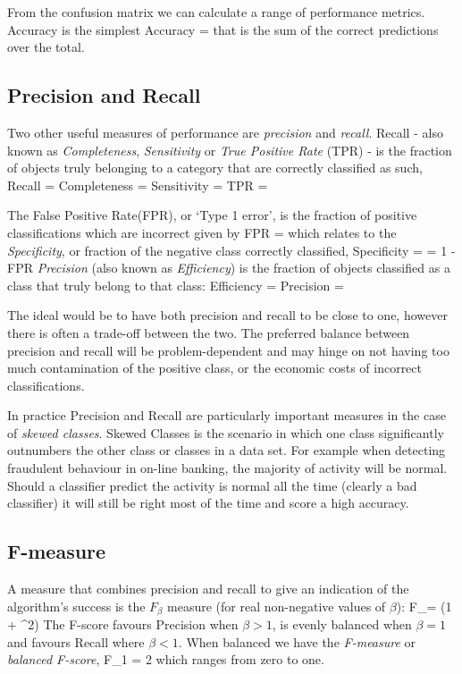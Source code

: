 From the confusion matrix we can calculate a range of performance metrics.
Accuracy is the simplest
\be
Accuracy = 
\ee
that is the sum of the correct predictions over the total.

\subsection{Precision and Recall}

Two other useful measures of performance are \textit{precision} and \textit{recall}\citep{flach2012machine}\citep{ball2010data}.
Recall - also known as \textit{Completeness}, \textit{Sensitivity} or \textit{True Positive Rate} (TPR) - is the fraction of objects truly belonging to a category that are correctly classified as such,
\be
Recall = Completeness = Sensitivity = TPR =  
\ee

The False Positive Rate(FPR), or `Type 1 error', is the fraction of positive classifications which are incorrect given by
\be
FPR = 
\ee
which relates to the \textit{Specificity}, or fraction of the negative class correctly classified,
\be
Specificity =  = 1 - FPR
\ee
\textit{Precision} (also known as \textit{Efficiency}) is the fraction of objects classified as a class that truly belong to that class:
\be
Efficiency = Precision =  
\ee

The ideal would be to have both precision and recall to be close to one, however there is often a trade-off between the two.
The preferred balance between precision and recall will be problem-dependent and may hinge on not having too much contamination of the positive class, or the economic costs of incorrect classifications.

In practice Precision and Recall are particularly important measures in the case of \textit{skewed classes}.
Skewed Classes is the scenario in which one class significantly outnumbers the other class or classes in a data set.
For example when detecting fraudulent behaviour in on-line banking, the majority of activity will be normal.
Should a classifier predict the activity is normal all the time (clearly a bad classifier) it will still be right most of the time and score a high accuracy.

\subsection{F-measure}
A measure that combines precision and recall to give an indication of the algorithm's success is the $F_\beta$ measure (for real non-negative values of $\beta$)\citep{sokolova2006beyond}\citep{davis2006relationship}:
\be
F_\beta = \left(1 + \beta^2\right)
\ee
The F-score favours Precision when $\beta > 1$, is evenly balanced when $\beta = 1$ and favours Recall where $\beta < 1$.
When balanced we have the \textit{F-measure} or\textit{ balanced F-score},
\be
F_1 = 2
\ee
which ranges from zero to one.

